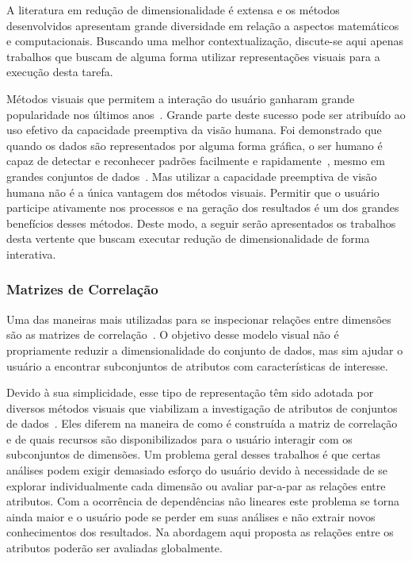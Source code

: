 A literatura em redução de dimensionalidade é extensa e os
métodos desenvolvidos apresentam grande diversidade em
relação a aspectos matemáticos e computacionais. Buscando
uma melhor contextualização, discute-se aqui apenas
trabalhos que buscam de alguma forma utilizar representações
visuais para a execução desta tarefa.

Métodos visuais que permitem a interação do usuário ganharam
grande popularidade nos últimos anos~\cite{State2012}.
Grande parte deste sucesso pode ser atribuído ao uso efetivo
da capacidade preemptiva da visão humana. Foi demonstrado
que quando os dados são representados por alguma forma
gráfica, o ser humano é capaz de detectar e reconhecer
padrões facilmente e rapidamente~\cite{Healey1995}, mesmo em
grandes conjuntos de dados~\cite{Fodor2002}. Mas utilizar a
capacidade preemptiva de visão humana não é a única vantagem
dos métodos visuais. Permitir que o usuário participe
ativamente nos processos e na geração dos resultados é um
dos grandes benefícios desses métodos. Deste
modo, a seguir serão apresentados os trabalhos desta 
vertente que buscam executar redução de dimensionalidade de
forma interativa.

\subsubsection{Matrizes de Correlação}\label{sss:cormat}

Uma das maneiras mais utilizadas para se inspecionar
relações entre dimensões são as matrizes de
correlação~\cite{Friendly2002}. O objetivo desse modelo
visual não é propriamente reduzir a dimensionalidade do
conjunto de dados, mas sim ajudar o usuário a encontrar
subconjuntos de atributos com características de interesse.

Devido à sua simplicidade, esse tipo de representação têm
sido adotada por diversos métodos visuais que viabilizam a
investigação de atributos de conjuntos de
dados~\citet{Friendly2002,Guo2003,MacEachren2003,
RBF2004,May2011ss,Johansson2009,Ingram2010,May2011}. Eles
diferem na maneira de como é construída a matriz de
correlação e de quais recursos são disponibilizados para o
usuário interagir com os subconjuntos de dimensões. Um
problema geral desses trabalhos é que certas análises podem
exigir demasiado esforço do usuário devido à necessidade de
se explorar individualmente cada dimensão ou avaliar
par-a-par as relações entre atributos. Com a ocorrência de
dependências não lineares este problema se torna ainda maior
e o usuário pode se perder em suas análises e não extrair
novos conhecimentos dos resultados. Na abordagem aqui
proposta as relações entre os atributos poderão ser
avaliadas globalmente.

